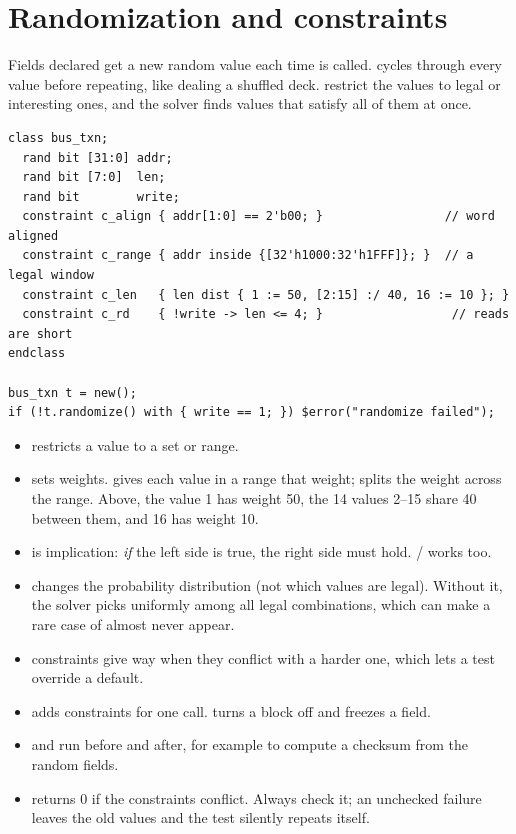\section{Randomization and constraints}

Fields declared  get a new random value each time  is called.  cycles through every value before repeating, like dealing a shuffled deck.  restrict the values to legal or interesting ones, and the solver finds values that satisfy all of them at once.

\begin{lstlisting}
class bus_txn;
  rand bit [31:0] addr;
  rand bit [7:0]  len;
  rand bit        write;
  constraint c_align { addr[1:0] == 2'b00; }                 // word aligned
  constraint c_range { addr inside {[32'h1000:32'h1FFF]}; }  // a legal window
  constraint c_len   { len dist { 1 := 50, [2:15] :/ 40, 16 := 10 }; }
  constraint c_rd    { !write -> len <= 4; }                  // reads are short
endclass

bus_txn t = new();
if (!t.randomize() with { write == 1; }) $error("randomize failed");
\end{lstlisting}

\begin{itemize}
  \item {} restricts a value to a set or range.
  \item {} sets weights. \code{:=} gives each value in a range that weight; \code{:/} splits the weight across the range. Above, the value 1 has weight 50, the 14 values 2--15 share 40 between them, and 16 has weight 10.
  \item \code{->} is implication: \emph{if} the left side is true, the right side must hold. / works too.
  \item {} changes the probability distribution (not which values are legal). Without it, the solver picks uniformly among all legal combinations, which can make a rare case of  almost never appear.
  \item {} constraints give way when they conflict with a harder one, which lets a test override a default.
  \item {} adds constraints for one call.  turns a block off and  freezes a field.
  \item {} and  run before and after, for example to compute a checksum from the random fields.
  \item {} returns 0 if the constraints conflict. Always check it; an unchecked failure leaves the old values and the test silently repeats itself.
\end{itemize}

